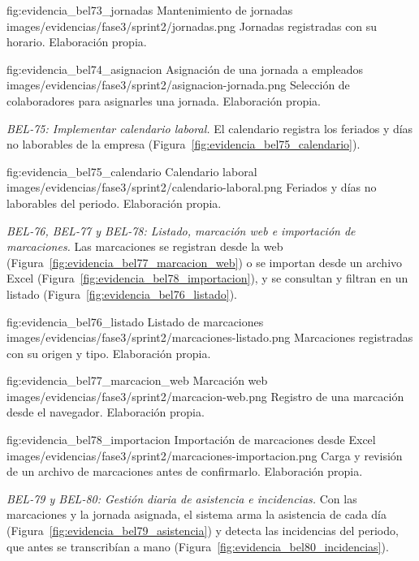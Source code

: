 \figuraEvidenciaCompacta
    {fig:evidencia_bel73_jornadas}
    {Mantenimiento de jornadas}
    {images/evidencias/fase3/sprint2/jornadas.png}
    {Jornadas registradas con su horario. Elaboración propia.}

\figuraEvidenciaCompacta
    {fig:evidencia_bel74_asignacion}
    {Asignación de una jornada a empleados}
    {images/evidencias/fase3/sprint2/asignacion-jornada.png}
    {Selección de colaboradores para asignarles una jornada. Elaboración propia.}

\par\smallskip
\noindent\textit{BEL-75: Implementar calendario laboral.}
El calendario registra los feriados y días no laborables de la empresa (Figura~\ref{fig:evidencia_bel75_calendario}).

\figuraEvidenciaCompacta
    {fig:evidencia_bel75_calendario}
    {Calendario laboral}
    {images/evidencias/fase3/sprint2/calendario-laboral.png}
    {Feriados y días no laborables del periodo. Elaboración propia.}

\clearpage
\par\smallskip
\noindent\textit{BEL-76, BEL-77 y BEL-78: Listado, marcación web e importación de marcaciones.}
Las marcaciones se registran desde la web (Figura~\ref{fig:evidencia_bel77_marcacion_web}) 
o se importan desde un archivo Excel (Figura~\ref{fig:evidencia_bel78_importacion}), 
y se consultan y filtran en un listado (Figura~\ref{fig:evidencia_bel76_listado}).

\figuraEvidenciaCompacta
    {fig:evidencia_bel76_listado}
    {Listado de marcaciones}
    {images/evidencias/fase3/sprint2/marcaciones-listado.png}
    {Marcaciones registradas con su origen y tipo. Elaboración propia.}

\figuraEvidenciaCompacta
    {fig:evidencia_bel77_marcacion_web}
    {Marcación web}
    {images/evidencias/fase3/sprint2/marcacion-web.png}
    {Registro de una marcación desde el navegador. Elaboración propia.}

\figuraEvidenciaCompacta
    {fig:evidencia_bel78_importacion}
    {Importación de marcaciones desde Excel}
    {images/evidencias/fase3/sprint2/marcaciones-importacion.png}
    {Carga y revisión de un archivo de marcaciones antes de confirmarlo. Elaboración propia.}

\par\smallskip
\noindent\textit{BEL-79 y BEL-80: Gestión diaria de asistencia e incidencias.}
Con las marcaciones y la jornada asignada, el sistema arma la asistencia de cada día (Figura~\ref{fig:evidencia_bel79_asistencia})
y detecta las incidencias del periodo, que antes se transcribían a mano (Figura~\ref{fig:evidencia_bel80_incidencias}).

